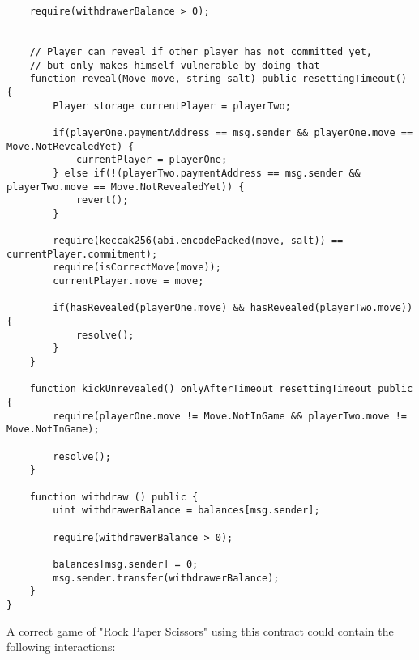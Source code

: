 \begin{verbatim}
    require(withdrawerBalance > 0);
   
    
    // Player can reveal if other player has not committed yet,
    // but only makes himself vulnerable by doing that
    function reveal(Move move, string salt) public resettingTimeout() {
        Player storage currentPlayer = playerTwo;
        
        if(playerOne.paymentAddress == msg.sender && playerOne.move == Move.NotRevealedYet) {
            currentPlayer = playerOne;
        } else if(!(playerTwo.paymentAddress == msg.sender && playerTwo.move == Move.NotRevealedYet)) {
            revert();
        }
        
        require(keccak256(abi.encodePacked(move, salt)) == currentPlayer.commitment);
        require(isCorrectMove(move));
        currentPlayer.move = move;
        
        if(hasRevealed(playerOne.move) && hasRevealed(playerTwo.move)) {
            resolve();
        }
    }
    
    function kickUnrevealed() onlyAfterTimeout resettingTimeout public {
        require(playerOne.move != Move.NotInGame && playerTwo.move != Move.NotInGame);
        
        resolve();
    }
    
    function withdraw () public {
        uint withdrawerBalance = balances[msg.sender];
        
        require(withdrawerBalance > 0);
        
        balances[msg.sender] = 0;
        msg.sender.transfer(withdrawerBalance);
    }
}
\end{verbatim}

A correct game of "Rock Paper Scissors" using this contract could contain the following interactions:

